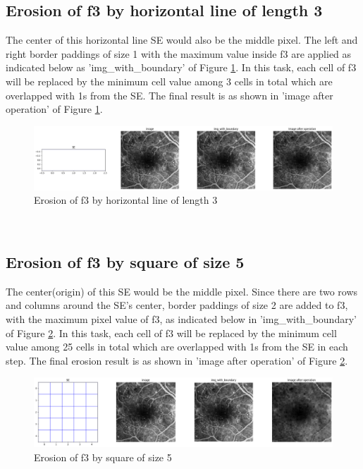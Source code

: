 \documentclass{article}
\begin{document}
\subsection{Erosion of f3 by horizontal line of length 3}
The center of this horizontal line SE would also be the middle pixel. The left and right border paddings of size 1 with the maximum value inside f3 are applied as indicated below as 'img\_with\_boundary' of Figure \ref{fig:ef3_e2}. In this task, each cell of f3 will be replaced by the minimum cell value among 3 cells in total which are overlapped with 1s from the SE. The final result is as shown in 'image after operation' of Figure \ref{fig:ef3_e2}.\\
\begin{figure}[h!]
\includegraphics[width=\linewidth]{images/ef3_e2.png}
\caption{Erosion of f3 by horizontal line of length 3}
\label{fig:ef3_e2}
\end{figure}
\\ 

\subsection{Erosion of f3 by square of size 5}
The center(origin) of this SE would be the middle pixel. Since there are two rows and columns around the SE's center, border paddings of size 2 are added to f3, with the maximum pixel value of f3, as indicated below in 'img\_with\_boundary' of Figure \ref{fig:ef3_e3}. In this task, each cell of f3 will be replaced by the minimum cell value among 25 cells in total which are overlapped with 1s from the SE in each step. The final erosion result is as shown in 'image after operation' of Figure \ref{fig:ef3_e3}.\\
\begin{figure}[h!]
\includegraphics[width=\linewidth]{images/ef3_e3.png}
\caption{Erosion of f3 by square of size 5}
\label{fig:ef3_e3}
\end{figure}
\\
\newpage
\end{document}
